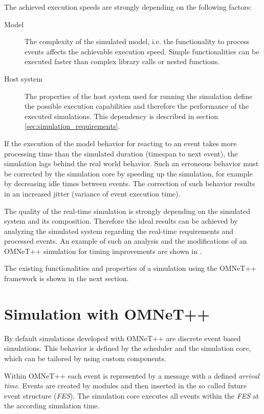 The achieved execution speeds are strongly depending on the following factors:
\begin{description}
    \item[Model] The complexity of the simulated model, i.e. the functionality to process events affects the achievable execution speed.
                 Simple functionalities can be executed faster than complex library calls or nested functions.
    \item[Host system] The properties of the host system used for running the simulation define the possible execution capabilities and therefore the performance of the executed simulations.
                       This dependency is described in section \ref{sec:simulation_requirements}.
\end{description}

If the execution of the model behavior for reacting to an event takes more processing time than the simulated duration (timespan to next event), the simulation lags behind the real world behavior.
Such an erroneous behavior must be corrected by the simulation core by speeding up the simulation, for example by decreasing idle times between events.
The correction of such behavior results in an increased jitter (variance of event execution time).
\cite[section III.B]{belanger_what_2010}

The quality of the real-time simulation is strongly depending on the simulated system and its composition.
Therefore the ideal results can be achieved by analyzing the simulated system regarding the real-time requirements and processed events.
An example of such an analysis and the modifications of an OMNeT++ simulation for timing improvements are shown in \cite{scussel_improvements_2015}.

The existing functionalities and properties of a simulation using the OMNeT++ framework is shown in the next section.

\section{Simulation with OMNeT++}
\label{sec:simulation_omnet}
By default simulations developed with OMNeT++ are discrete event based simulations.
This behavior is defined by the scheduler and the simulation core, which can be tailored by using custom components. \cite[section 4.1]{omnet_manual}

Within OMNeT++ each event is represented by a message with a defined \emph{arrival time}.
Events are created by modules and then inserted in the so called future event structure (\emph{FES}).
The simulation core executes all events within the \emph{FES} at the according simulation time.

